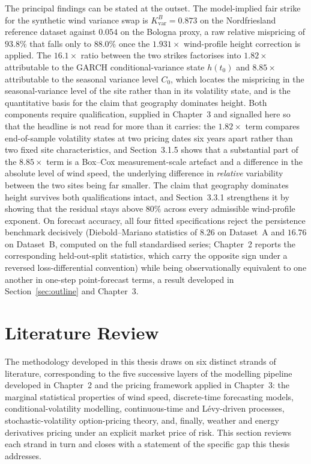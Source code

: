 \documentclass[11pt, a4paper, twoside]{article}
\begin{document}
The principal findings can be stated at the outset. The model-implied fair strike for the synthetic wind variance swap is $K_{\text{var}}^B = 0.873$ on the Nordfriesland reference dataset against $0.054$ on the Bologna proxy, a raw relative mispricing of $93.8\%$ that falls only to $88.0\%$ once the $1.931\times$ wind-profile height correction is applied. The $16.1\times$ ratio between the two strikes factorises into $1.82\times$ attributable to the GARCH conditional-variance state $h(t_0)$ and $8.85\times$ attributable to the seasonal variance level $C_0$, which locates the mispricing in the seasonal-variance level of the site rather than in its volatility state, and is the quantitative basis for the claim that geography dominates height. Both components require qualification, supplied in Chapter~3 and signalled here so that the headline is not read for more than it carries: the $1.82\times$ term compares end-of-sample volatility states at two pricing dates six years apart rather than two fixed site characteristics, and Section~3.1.5 shows that a substantial part of the $8.85\times$ term is a Box--Cox measurement-scale artefact and a difference in the absolute level of wind speed, the underlying difference in \emph{relative} variability between the two sites being far smaller. The claim that geography dominates height survives both qualifications intact, and Section~3.3.1 strengthens it by showing that the residual stays above $80\%$ across every admissible wind-profile exponent. On forecast accuracy, all four fitted specifications reject the persistence benchmark decisively (Diebold--Mariano statistics of $8.26$ on Dataset~A and $16.76$ on Dataset~B, computed on the full standardised series; Chapter~2 reports the corresponding held-out-split statistics, which carry the opposite sign under a reversed loss-differential convention) while being observationally equivalent to one another in one-step point-forecast terms, a result developed in Section~\ref{sec:outline} and Chapter~3.

\section{Literature Review}
\label{sec:litreview}

The methodology developed in this thesis draws on six distinct strands of literature, corresponding to the five successive layers of the modelling pipeline developed in Chapter~2 and the pricing framework applied in Chapter~3: the marginal statistical properties of wind speed, discrete-time forecasting models, conditional-volatility modelling, continuous-time and Lévy-driven processes, stochastic-volatility option-pricing theory, and, finally, weather and energy derivatives pricing under an explicit market price of risk. This section reviews each strand in turn and closes with a statement of the specific gap this thesis addresses.
\end{document}
